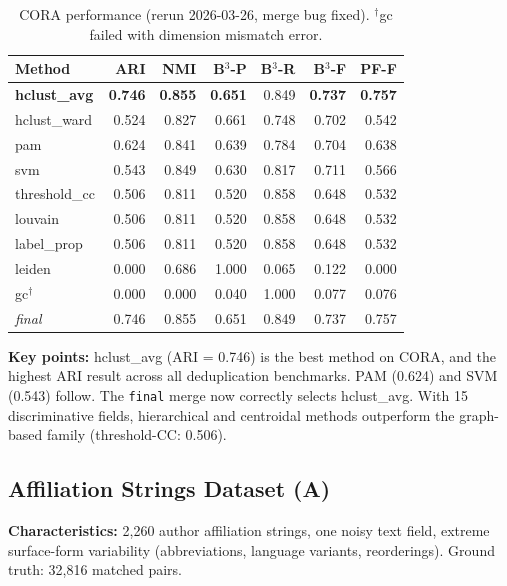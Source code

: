 \documentclass[11pt, a4paper]{article}
\newcommand{\good}[1]{{\color{good}\textbf{#1}}}
\begin{document}
\begin{table}[h!]
\centering
\small
\setlength{\tabcolsep}{4pt}
\begin{tabular}{lrrrrrr}
\toprule
\textbf{Method} & \textbf{ARI} & \textbf{NMI} & \textbf{B$^3$-P} & \textbf{B$^3$-R} & \textbf{B$^3$-F} & \textbf{PF-F} \\
\midrule
\good{hclust\_avg} & \good{0.746} & \good{0.855} & \good{0.651} & 0.849 & \good{0.737} & \good{0.757} \\
hclust\_ward     & 0.524 & 0.827 & 0.661 & 0.748 & 0.702 & 0.542 \\
pam              & 0.624 & 0.841 & 0.639 & 0.784 & 0.704 & 0.638 \\
svm              & 0.543 & 0.849 & 0.630 & 0.817 & 0.711 & 0.566 \\
threshold\_cc    & 0.506 & 0.811 & 0.520 & 0.858 & 0.648 & 0.532 \\
louvain          & 0.506 & 0.811 & 0.520 & 0.858 & 0.648 & 0.532 \\
label\_prop      & 0.506 & 0.811 & 0.520 & 0.858 & 0.648 & 0.532 \\
leiden           & 0.000 & 0.686 & 1.000 & 0.065 & 0.122 & 0.000 \\
gc$^\dagger$     & 0.000 & 0.000 & 0.040 & 1.000 & 0.077 & 0.076 \\
\midrule
\textit{final}   & 0.746 & 0.855 & 0.651 & 0.849 & 0.737 & 0.757 \\
\bottomrule
\end{tabular}
\caption{CORA performance (rerun 2026-03-26, merge bug fixed).
$^\dagger$gc failed with dimension mismatch error.}
\end{table}

\textbf{Key points:} hclust\_avg (ARI = 0.746) is the best method on CORA, and the
highest ARI result across all deduplication benchmarks. PAM (0.624) and SVM (0.543) follow.
The \texttt{final} merge now correctly selects hclust\_avg. With 15 discriminative fields,
hierarchical and centroidal methods outperform the graph-based family (threshold-CC: 0.506).

\subsection{Affiliation Strings Dataset (A)}

\textbf{Characteristics:} 2,260 author affiliation strings, one noisy text
field, extreme surface-form variability (abbreviations, language variants,
reorderings). Ground truth: 32,816 matched pairs.
\end{document}
